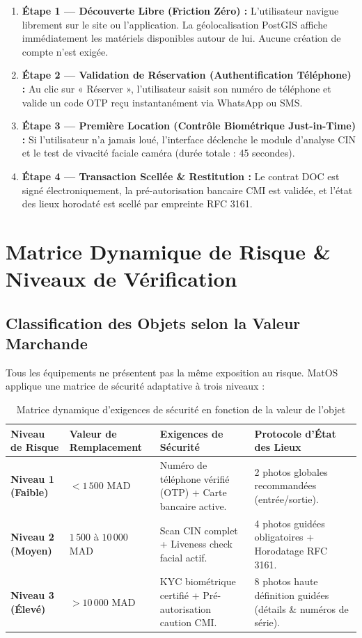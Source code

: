 \documentclass[11pt,a4paper]{report}
\begin{document}
\begin{enumerate}[leftmargin=*]
    \item \textbf{Étape 1 --- Découverte Libre (Friction Zéro) :} L'utilisateur navigue librement sur le site ou l'application. La géolocalisation PostGIS affiche immédiatement les matériels disponibles autour de lui. Aucune création de compte n'est exigée.
    \item \textbf{Étape 2 --- Validation de Réservation (Authentification Téléphone) :} Au clic sur « Réserver », l'utilisateur saisit son numéro de téléphone et valide un code OTP reçu instantanément via WhatsApp ou SMS.
    \item \textbf{Étape 3 --- Première Location (Contrôle Biométrique Just-in-Time) :} Si l'utilisateur n'a jamais loué, l'interface déclenche le module d'analyse CIN et le test de vivacité faciale caméra (durée totale : 45 secondes).
    \item \textbf{Étape 4 --- Transaction Scellée \& Restitution :} Le contrat DOC est signé électroniquement, la pré-autorisation bancaire CMI est validée, et l'état des lieux horodaté est scellé par empreinte RFC 3161.
\end{enumerate}

\chapter{Matrice Dynamique de Risque \& Niveaux de Vérification}

\section{Classification des Objets selon la Valeur Marchande}
Tous les équipements ne présentent pas la même exposition au risque. MatOS applique une matrice de sécurité adaptative à trois niveaux :

\begin{table}[h!]
\centering
\small
\begin{tabularx}{\textwidth}{p{2.8cm} p{3.2cm} p{3.8cm} X}
\toprule
\textbf{Niveau de Risque} & \textbf{Valeur de Remplacement} & \textbf{Exigences de Sécurité} & \textbf{Protocole d'État des Lieux} \\
\midrule
\textbf{Niveau 1 (Faible)} & $< 1\,500$ MAD & Numéro de téléphone vérifié (OTP) + Carte bancaire active. & 2 photos globales recommandées (entrée/sortie). \\
\addlinespace
\textbf{Niveau 2 (Moyen)} & $1\,500$ à $10\,000$ MAD & Scan CIN complet + Liveness check facial actif. & 4 photos guidées obligatoires + Horodatage RFC 3161. \\
\addlinespace
\textbf{Niveau 3 (Élevé)} & $> 10\,000$ MAD & KYC biométrique certifié + Pré-autorisation caution CMI. & 8 photos haute définition guidées (détails \& numéros de série). \\
\bottomrule
\end{tabularx}
\caption{Matrice dynamique d'exigences de sécurité en fonction de la valeur de l'objet}
\end{table}
\end{document}
